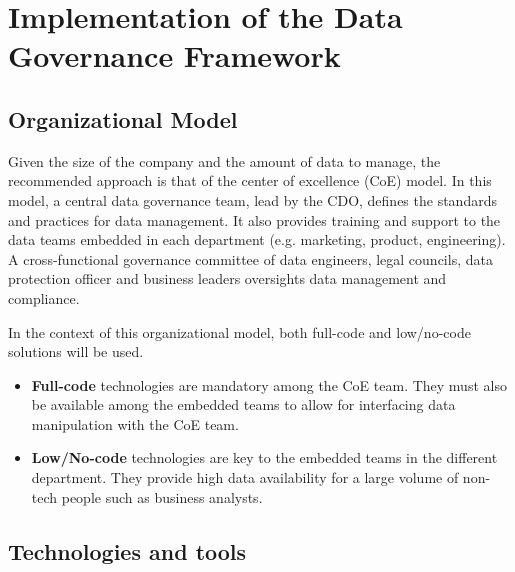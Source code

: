 \documentclass[11pt,a4paper,computermodern]{article}
\begin{document}
\section{Implementation of the Data Governance Framework}

\subsection*{Organizational Model}

Given the size of the company and the amount of data to manage, the recommended approach is that of the center of excellence (CoE) model. In this model, a central data governance team, lead by the CDO, defines the standards and practices for data management. It also provides training and support to the data teams embedded in each department (e.g. marketing, product, engineering). A cross-functional governance committee of data engineers, legal councils, data protection officer and business leaders oversights data management and compliance.

In the context of this organizational model, both full-code and low/no-code solutions will be used.
\begin{itemize}
	\item \textbf{Full-code} technologies are mandatory among the CoE team. They must also be available among the embedded teams to allow for interfacing data manipulation with the CoE team.
	\item \textbf{Low/No-code} technologies are key to the embedded teams in the different department. They provide high data availability for a large volume of non-tech people such as business analysts.
\end{itemize}


\subsection*{Technologies and tools}
\end{document}
